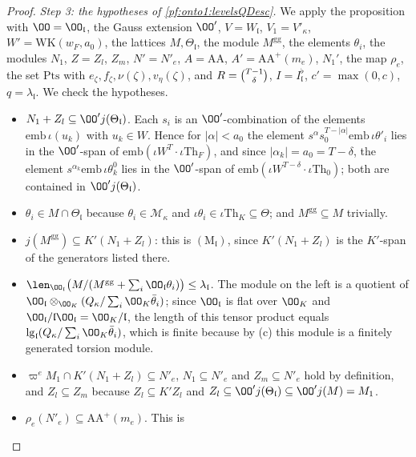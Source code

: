 \begin{proof}
\emph{Step 3: the hypotheses of \cref{pf:onto1:levelsQDesc}.} We apply the proposition with $\OO=\OO_{\mathfrak l}$,
the Gauss extension $\OO'$, $V=W_{\mathfrak l}$, $V_1=V'_\kappa$, $W'=\mathrm{WK}(w_F,a_0)$, the lattices $M,\Theta_{\mathfrak l}$,
the module $M^{\mathrm{gg}}$, the elements $\theta_i$, the modules $N_1$, $Z=Z_l$, $Z_m$, $N'=N'_e$, $A=\mathrm{AA}$,
$A'=\mathrm{AA}^+(m_e)$, $N_1'$, the map $\rho_e$, the set $\mathrm{Pts}$ with $e_\zeta,f_\zeta,\nu(\zeta),v_\eta(\zeta)$, and
$R=\binom{T-1}{\delta}$, $I=I_{\mathfrak l}^\flat$, $c'=\max(0,c)$, $q=\lambda_{\mathfrak l}$. We check the hypotheses.
\begin{itemize}
\item $N_1+Z_l\subseteq\OO'j(\Theta_{\mathfrak l})$. Each $s_i$ is an $\OO'$-combination of the elements
$\mathrm{emb}\,\iota(u_k)$ with $u_k\in W$. Hence for $|\alpha|<a_0$ the element $s^\alpha s_0^{T-|\alpha|}\mathrm{emb}\,\iota\theta'_i$
lies in the $\OO'$-span of $\mathrm{emb}(\iota W^T\cdot\iota\mathrm{Th}_F)$, and since $|\alpha_k|=a_0=T-\delta$, the element
$s^{\alpha_k}\mathrm{emb}\,\iota\theta^0_k$ lies in the $\OO'$-span of $\mathrm{emb}(\iota W^{T-\delta}\cdot\iota\mathrm{Th}_0)$; both are
contained in $\OO'j(\Theta_{\mathfrak l})$.
\item $\theta_i\in M\cap\Theta_{\mathfrak l}$ because $\theta_i\in\mathcal M_\kappa$ and $\iota\theta_i\in\iota\mathrm{Th}_K\subseteq\Theta$;
and $M^{\mathrm{gg}}\subseteq M$ trivially.
\item $j(M^{\mathrm{gg}})\subseteq K'(N_1+Z_l)$: this is $(\mathrm M_{\mathfrak l})$, since $K'(N_1+Z_l)$ is the $K'$-span of the
generators listed there.
\item $\len_{\OO_{\mathfrak l}}\bigl(M/(M^{\mathrm{gg}}+\sum_i\OO_{\mathfrak l}\theta_i)\bigr)\le\lambda_{\mathfrak l}$. The module on
the left is a quotient of $\OO_{\mathfrak l}\otimes_{\OO_K}(Q_\kappa/\sum_i\OO_K\bar\theta_i)$; since $\OO_{\mathfrak l}$ is flat
over $\OO_K$ and $\OO_{\mathfrak l}/\mathfrak l\OO_{\mathfrak l}=\OO_K/\mathfrak l$, the length of this tensor product equals
$\ontoonelg_{\mathfrak l}(Q_\kappa/\sum_i\OO_K\bar\theta_i)$, which is finite because by (c) this module is a finitely
generated torsion module.
\item $\varpi^eM_1\cap K'(N_1+Z_l)\subseteq N'_e$, $N_1\subseteq N'_e$ and $Z_m\subseteq N'_e$ hold by definition, and
$Z_l\subseteq Z_m$ because $Z_l\subseteq K'Z_l$ and $Z_l\subseteq\OO'j(\Theta_{\mathfrak l})\subseteq\OO'j(M)=M_1$.
\item $\rho_e(N'_e)\subseteq\mathrm{AA}^+(m_e)$. This is

\end{itemize}
\end{proof}
